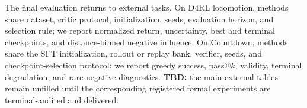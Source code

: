 


The final evaluation returns to external tasks. On D4RL locomotion, methods share dataset, critic protocol, initialization, seeds, evaluation horizon, and selection rule; we report normalized return, uncertainty, best and terminal checkpoints, and distance-binned negative influence. On Countdown, methods share the SFT initialization, rollout or replay bank, verifier, seeds, and checkpoint-selection protocol; we report greedy success, pass@$k$, validity, terminal degradation, and rare-negative diagnostics. \textbf{TBD:} the main external tables remain unfilled until the corresponding registered formal experiments are terminal-audited and delivered.



